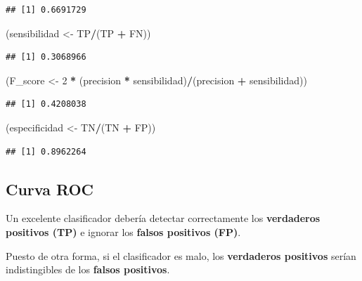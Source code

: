 \documentclass[
  12pt,
]{book}
\newenvironment{Shaded}{\begin{snugshade}}{\end{snugshade}}
\newcommand{\DecValTok}[1]{\textcolor[rgb]{0.00,0.00,0.81}{#1}}
\newcommand{\NormalTok}[1]{#1}
\newcommand{\OperatorTok}[1]{\textcolor[rgb]{0.81,0.36,0.00}{\textbf{#1}}}
\newcommand{\StringTok}[1]{\textcolor[rgb]{0.31,0.60,0.02}{#1}}
\theoremstyle{definition}
\theoremstyle{definition}
\theoremstyle{definition}
\theoremstyle{remark}
\begin{document}
\begin{verbatim}
## [1] 0.6691729
\end{verbatim}

\begin{Shaded}
\begin{Highlighting}[]
\NormalTok{(sensibilidad <-}\StringTok{ }\NormalTok{TP}\OperatorTok{/}\NormalTok{(TP }\OperatorTok{+}\StringTok{ }\NormalTok{FN))}
\end{Highlighting}
\end{Shaded}

\begin{verbatim}
## [1] 0.3068966
\end{verbatim}

\begin{Shaded}
\begin{Highlighting}[]
\NormalTok{(F_score <-}\StringTok{ }\DecValTok{2} \OperatorTok{*}\StringTok{ }\NormalTok{(precision }\OperatorTok{*}\StringTok{ }\NormalTok{sensibilidad)}\OperatorTok{/}\NormalTok{(precision }\OperatorTok{+}\StringTok{ }
\StringTok{    }\NormalTok{sensibilidad))}
\end{Highlighting}
\end{Shaded}

\begin{verbatim}
## [1] 0.4208038
\end{verbatim}

\begin{Shaded}
\begin{Highlighting}[]
\NormalTok{(especificidad <-}\StringTok{ }\NormalTok{TN}\OperatorTok{/}\NormalTok{(TN }\OperatorTok{+}\StringTok{ }\NormalTok{FP))}
\end{Highlighting}
\end{Shaded}

\begin{verbatim}
## [1] 0.8962264
\end{verbatim}

\hypertarget{curva-roc}{%
\subsection{Curva ROC}\label{curva-roc}}

Un excelente clasificador debería detectar correctamente los \textbf{verdaderos positivos (TP)} e ignorar los \textbf{falsos positivos (FP)}.

Puesto de otra forma, si el clasificador es malo, los \textbf{verdaderos positivos} serían indistingibles de los \textbf{falsos positivos}.
\end{document}
